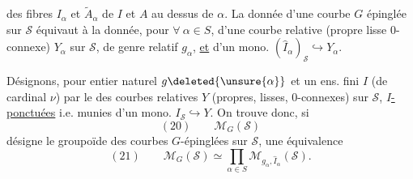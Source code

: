 des fibres $I_\alpha$ et $\widetilde A_\alpha$ de $I$ et $A$ au dessus de $\alpha$. La donnée d'une courbe  $G$ épinglée sur $\mathcal S$ équivaut à la donnée,  pour $\forall\ \alpha\in S$, d'une courbe relative (propre lisse  $0$-connexe) $Y_\alpha$ sur $\mathcal S$, de genre relatif $g_\alpha$, \uline{et} d'un mono. $(\widehat I_\alpha)_{\mathcal S}\hookrightarrow Y_\alpha$.

Désignons,  pour  entier naturel $g\deleted{\unsure{\alpha}}$ et un ens. fini $I$ (de cardinal $\nu$) par
le  des courbes relatives $Y$ (propres, lisses, $0$-connexes) sur $\mathcal S$, \uline{$I$-ponctuées} i.e. munies d'un mono. $I_{\mathcal S}\hookrightarrow Y$. On trouve donc, si
\[
(20)\qquad\mathcal M_G(\mathcal S)
\]
désigne le groupoïde des courbes  $G$-épinglées sur $\mathcal S$, une équivalence
\[
(21)\qquad\mathcal M_G(\mathcal S)\simeq\prod_{\alpha\in S}\mathcal M_{g_\alpha,\widehat I_\alpha}(\mathcal S).
\]
